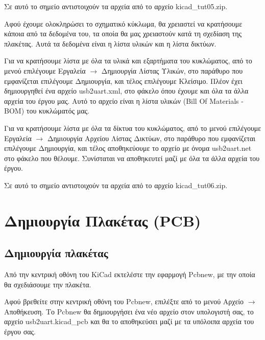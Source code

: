 \documentclass[a4paper]{article}
\begin{document}
Σε αυτό το σημείο αντιστοιχούν τα αρχεία από το αρχείο kicad\_tut05.zip.

Αφού έχουμε ολοκληρώσει το σχηματικό κύκλωμα, θα χρειαστεί να κρατήσουμε κάποια από τα δεδομένα του, τα οποία θα μας χρειαστούν κατά τη σχεδίαση της πλακέτας. Αυτά τα δεδομένα είναι η λίστα υλικών και η λίστα δικτύων.

Για να κρατήσουμε λίστα με όλα τα υλικά και εξαρτήματα του κυκλώματος, από το μενού επιλέγουμε Εργαλεία $\rightarrow$ Δημιουργία Λίστας Υλικών, στο παράθυρο που εμφανίζεται επιλέγουμε Δημιουργία, και τέλος επιλέγουμε Κλείσιμο. Πλέον έχει δημιουργηθεί ένα αρχείο usb2uart.xml, στο φάκελο όπου έχουμε και όλα τα άλλα αρχεία του έργου μας. Αυτό το αρχείο είναι η λίστα υλικών (Bill Of Materials - BOM) του κυκλώματός μας.

Για να κρατήσουμε λίστα με όλα τα δίκτυα του κυκλώματος, από το μενού επιλέγουμε Εργαλεία $\rightarrow$ Δημιουργία Αρχείου Λίστας Δικτύων, στο παράθυρο που εμφανίζεται επιλέγουμε Δημιουργία, και τέλος αποθηκεύουμε το αρχείο με όνομα usb2uart.net στο φάκελο που θέλουμε. Συνίσταται να αποθηκευτεί μαζί με όλα τα άλλα αρχεία του έργου.


Σε αυτό το σημείο αντιστοιχούν τα αρχεία από το αρχείο kicad\_tut06.zip.


\section{Δημιουργία Πλακέτας (PCB)}

\subsection{Δημιουργία πλακέτας}
Από την κεντρική οθόνη του \textenglish{KiCad} εκτελέστε την εφαρμογή \textenglish{Pcbnew}, με την οποία θα σχεδιάσουμε την πλακέτα.

\begin{figure}
  \begin{center}
    \label{fig:kicad-main}
  \end{center}
\end{figure}

Αφού βρεθείτε στην κεντρική οθόνη του \textenglish{Pcbnew}, επιλέξτε από το μενού Αρχείο $\rightarrow$ Αποθήκευση. Το \textenglish{Pcbnew} θα δημιουργήσει ένα νέο αρχείο στον υπολογιστή σας, το αρχείο usb2uart.kicad\_pcb και θα το αποθηκεύσει μαζί με τα υπόλοιπα αρχεία του έργου σας.
\end{document}
